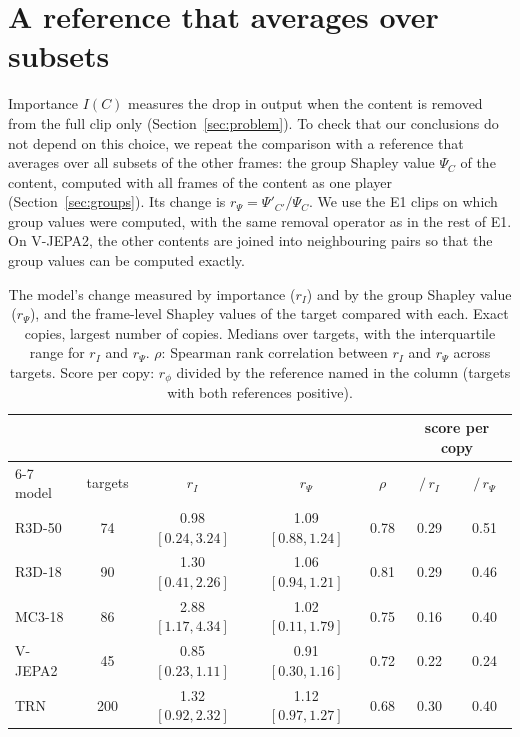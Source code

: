 \section{A reference that averages over subsets}
\label{app:reference}


Importance $I(C)$ measures the drop in output when the content is removed from the full clip only (Section~\ref{sec:problem}).
To check that our conclusions do not depend on this choice, we repeat the comparison with a reference that averages over all subsets of the other frames: the group Shapley value $\Psi_C$ of the content, computed with all frames of the content as one player (Section~\ref{sec:groups}).
Its change is $r_\Psi = \Psi'_{C'} / \Psi_C$.
We use the E1 clips on which group values were computed, with the same removal operator as in the rest of E1.
On V-JEPA2, the other contents are joined into neighbouring pairs so that the group values can be computed exactly.

\begin{table}[h]
\centering
\caption{The model's change measured by importance ($r_I$) and by the group Shapley value ($r_\Psi$), and the frame-level Shapley values of the target compared with each. Exact copies, largest number of copies. Medians over targets, with the interquartile range for $r_I$ and $r_\Psi$. $\rho$: Spearman rank correlation between $r_I$ and $r_\Psi$ across targets. Score per copy: $r_\phi$ divided by the reference named in the column (targets with both references positive).}
\label{tab:reference}
\begin{tabular}{lcccccc}
\toprule
 & & & & & \multicolumn{2}{c}{score per copy} \\
\cmidrule(lr){6-7}
model & targets & $r_I$ & $r_\Psi$ & $\rho$ & $/\,r_I$ & $/\,r_\Psi$ \\
\midrule
R3D-50  & 74  & 0.98 $[0.24, 3.24]$ & 1.09 $[0.88, 1.24]$ & 0.78 & 0.29 & 0.51 \\
R3D-18  & 90  & 1.30 $[0.41, 2.26]$ & 1.06 $[0.94, 1.21]$ & 0.81 & 0.29 & 0.46 \\
MC3-18  & 86  & 2.88 $[1.17, 4.34]$ & 1.02 $[0.11, 1.79]$ & 0.75 & 0.16 & 0.40 \\
V-JEPA2 & 45  & 0.85 $[0.23, 1.11]$ & 0.91 $[0.30, 1.16]$ & 0.72 & 0.22 & 0.24 \\
TRN     & 200 & 1.32 $[0.92, 2.32]$ & 1.12 $[0.97, 1.27]$ & 0.68 & 0.30 & 0.40 \\
\bottomrule
\end{tabular}
\end{table}

